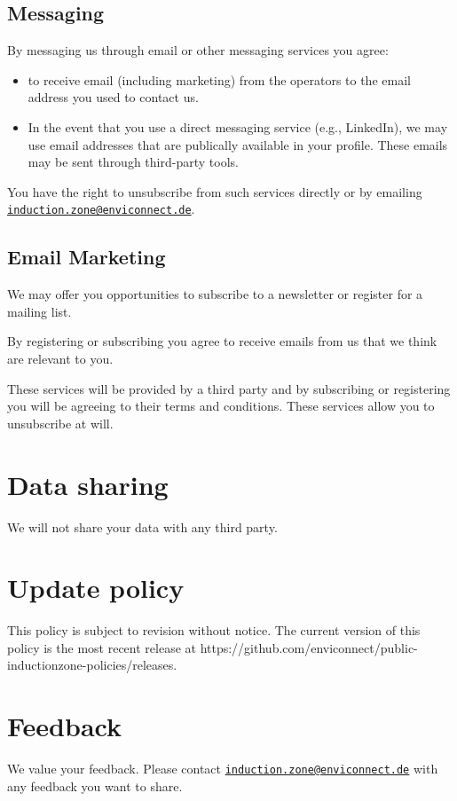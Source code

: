 \documentclass[
  10pt,
  a4paper,
]{article}
\providecommand{\tightlist}{%
  \setlength{\itemsep}{0pt}\setlength{\parskip}{0pt}}
\begin{document}
\hypertarget{messaging}{%
\subsection{Messaging}\label{messaging}}

By messaging us through email or other messaging services you agree:

\begin{itemize}
\tightlist
\item
  to receive email (including marketing) from the operators to the email
  address you used to contact us.
\item
  In the event that you use a direct messaging service (e.g., LinkedIn),
  we may use email addresses that are publically available in your
  profile. These emails may be sent through third-party tools.
\end{itemize}

You have the right to unsubscribe from such services directly or by
emailing
\href{mailto:induction.zone@enviconnect.de}{\nolinkurl{induction.zone@enviconnect.de}}.

\hypertarget{email-marketing}{%
\subsection{Email Marketing}\label{email-marketing}}

We may offer you opportunities to subscribe to a newsletter or register
for a mailing list.

By registering or subscribing you agree to receive emails from us that
we think are relevant to you.

These services will be provided by a third party and by subscribing or
registering you will be agreeing to their terms and conditions. These
services allow you to unsubscribe at will.

\hypertarget{data-sharing}{%
\section{Data sharing}\label{data-sharing}}

We will not share your data with any third party.

\hypertarget{update-policy}{%
\section{Update policy}\label{update-policy}}

This policy is subject to revision without notice. The current version
of this policy is the most recent release at
https://github.com/enviconnect/public-inductionzone-policies/releases.

\hypertarget{feedback}{%
\section{Feedback}\label{feedback}}

We value your feedback. Please contact
\href{mailto:induction.zone@enviconnect.de}{\nolinkurl{induction.zone@enviconnect.de}}
with any feedback you want to share.
\end{document}
